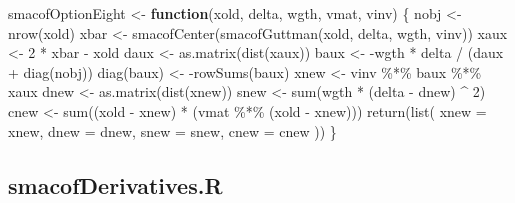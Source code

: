 \documentclass[
  12pt,
  letterpaper,
  DIV=11,
  numbers=noendperiod]{scrartcl}
\newenvironment{Shaded}{\begin{snugshade}}{\end{snugshade}}
\newcommand{\AttributeTok}[1]{\textcolor[rgb]{0.40,0.45,0.13}{#1}}
\newcommand{\ControlFlowTok}[1]{\textcolor[rgb]{0.00,0.23,0.31}{\textbf{#1}}}
\newcommand{\DecValTok}[1]{\textcolor[rgb]{0.68,0.00,0.00}{#1}}
\newcommand{\FunctionTok}[1]{\textcolor[rgb]{0.28,0.35,0.67}{#1}}
\newcommand{\NormalTok}[1]{\textcolor[rgb]{0.00,0.23,0.31}{#1}}
\newcommand{\OtherTok}[1]{\textcolor[rgb]{0.00,0.23,0.31}{#1}}
\newcommand{\SpecialCharTok}[1]{\textcolor[rgb]{0.37,0.37,0.37}{#1}}
\begin{document}
\begin{Shaded}
\begin{Highlighting}[]
\NormalTok{smacofOptionEight }\OtherTok{\textless{}{-}} \ControlFlowTok{function}\NormalTok{(xold, delta, wgth, vmat, vinv) \{}
\NormalTok{  nobj }\OtherTok{\textless{}{-}} \FunctionTok{nrow}\NormalTok{(xold)}
\NormalTok{  xbar }\OtherTok{\textless{}{-}} \FunctionTok{smacofCenter}\NormalTok{(}\FunctionTok{smacofGuttman}\NormalTok{(xold, delta, wgth, vinv))}
\NormalTok{  xaux }\OtherTok{\textless{}{-}} \DecValTok{2} \SpecialCharTok{*}\NormalTok{ xbar }\SpecialCharTok{{-}}\NormalTok{ xold}
\NormalTok{  daux }\OtherTok{\textless{}{-}} \FunctionTok{as.matrix}\NormalTok{(}\FunctionTok{dist}\NormalTok{(xaux))}
\NormalTok{  baux }\OtherTok{\textless{}{-}} \SpecialCharTok{{-}}\NormalTok{wgth }\SpecialCharTok{*}\NormalTok{ delta }\SpecialCharTok{/}\NormalTok{ (daux }\SpecialCharTok{+} \FunctionTok{diag}\NormalTok{(nobj))}
  \FunctionTok{diag}\NormalTok{(baux) }\OtherTok{\textless{}{-}} \SpecialCharTok{{-}}\FunctionTok{rowSums}\NormalTok{(baux)}
\NormalTok{  xnew }\OtherTok{\textless{}{-}}\NormalTok{ vinv }\SpecialCharTok{\%*\%}\NormalTok{ baux }\SpecialCharTok{\%*\%}\NormalTok{ xaux}
\NormalTok{  dnew }\OtherTok{\textless{}{-}} \FunctionTok{as.matrix}\NormalTok{(}\FunctionTok{dist}\NormalTok{(xnew))}
\NormalTok{  snew }\OtherTok{\textless{}{-}} \FunctionTok{sum}\NormalTok{(wgth }\SpecialCharTok{*}\NormalTok{ (delta }\SpecialCharTok{{-}}\NormalTok{ dnew) }\SpecialCharTok{\^{}} \DecValTok{2}\NormalTok{)}
\NormalTok{  cnew }\OtherTok{\textless{}{-}} \FunctionTok{sum}\NormalTok{((xold }\SpecialCharTok{{-}}\NormalTok{ xnew) }\SpecialCharTok{*}\NormalTok{ (vmat }\SpecialCharTok{\%*\%}\NormalTok{ (xold }\SpecialCharTok{{-}}\NormalTok{ xnew)))}
  \FunctionTok{return}\NormalTok{(}\FunctionTok{list}\NormalTok{(}
    \AttributeTok{xnew =}\NormalTok{ xnew,}
    \AttributeTok{dnew =}\NormalTok{ dnew,}
    \AttributeTok{snew =}\NormalTok{ snew,}
    \AttributeTok{cnew =}\NormalTok{ cnew}
\NormalTok{  ))}
\NormalTok{\}}
\end{Highlighting}
\end{Shaded}

\subsection{smacofDerivatives.R}\label{smacofderivatives.r}
\end{document}
